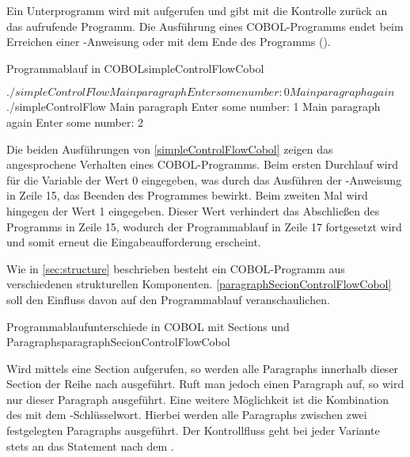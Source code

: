 Ein Unterprogramm wird mit  aufgerufen und gibt mit  die Kontrolle zurück an das aufrufende Programm. Die Ausführung eines COBOL-Programms endet beim Erreichen einer -Anweisung oder mit dem Ende des Programms (). 

\begin{codeWithCaption}{Programmablauf in COBOL}{simpleControlFlowCobol}
\begin{shellwindow}
$ ./simpleControlFlow 
Main paragraph
Enter some number: 0
Main paragraph again
$ ./simpleControlFlow 
Main paragraph
Enter some number: 1 
Main paragraph again
Enter some number: 2
\end{shellwindow}
\end{codeWithCaption}

Die beiden Ausführungen von \autoref{simpleControlFlowCobol} zeigen das angesprochene Verhalten eines COBOL-Programms. Beim ersten Durchlauf wird für die Variable  der Wert 0 eingegeben, was durch das Ausführen der -Anweisung in Zeile 15, das Beenden des Programmes bewirkt. Beim zweiten Mal wird hingegen der Wert 1 eingegeben. Dieser Wert verhindert das Abschließen des Programms in Zeile 15, wodurch der Programmablauf in Zeile 17 fortgesetzt wird und somit erneut die Eingabeaufforderung erscheint.

Wie in \autoref{sec:structure} beschrieben besteht ein COBOL-Programm aus verschiedenen strukturellen Komponenten. \autoref{paragraphSecionControlFlowCobol} soll den Einfluss davon auf den Pro\-grammab\-lauf veranschaulichen.

\begin{codeWithCaption}{Programmablaufunterschiede in COBOL mit Sections und Paragraphs}{paragraphSecionControlFlowCobol}
\end{codeWithCaption}

Wird mittels  eine Section aufgerufen, so werden alle Paragraphs innerhalb dieser Section der Reihe nach ausgeführt. Ruft man jedoch einen Paragraph auf, so wird nur dieser Paragraph ausgeführt. Eine weitere Möglichkeit ist die Kombination des  mit dem -Schlüsselwort. Hierbei werden alle Paragraphs zwischen zwei festgelegten Paragraphs ausgeführt. Der Kontrollfluss geht bei jeder Variante stets an das Statement nach dem .

